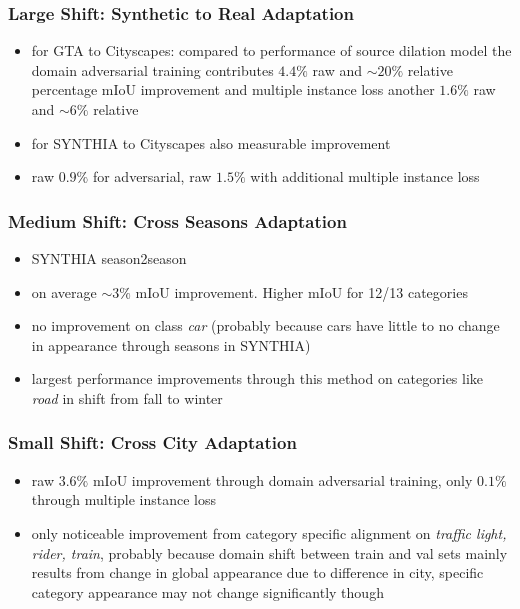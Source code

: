 
\subsubsection{Large Shift: Synthetic to Real Adaptation}
\begin{itemize}
	\item for GTA to Cityscapes: compared to performance of source dilation model the domain adversarial training contributes $4.4\%$ raw and $\sim 20\%$ relative percentage mIoU improvement and multiple instance loss another $1.6\%$ raw and $\sim 6 \%$ relative
	\item for SYNTHIA to Cityscapes also measurable improvement
	\item raw $0.9\%$ for adversarial, raw $1.5\%$ with additional multiple instance loss
\end{itemize}

\subsubsection{Medium Shift: Cross Seasons Adaptation}
\begin{itemize}
	\item SYNTHIA season2season
	\item on average $\sim 3 \%$ mIoU improvement. Higher mIoU for 12/13 categories
	\item no improvement on class \textit{car} (probably because cars have little to no change in appearance through seasons in SYNTHIA)
	\item largest performance improvements through this method on categories like \textit{road} in shift from fall to winter
\end{itemize}

\subsubsection{Small Shift: Cross City Adaptation}
\begin{itemize}
	\item raw $3.6\%$ mIoU improvement through domain adversarial training, only $0.1\%$ through multiple instance loss
	\item only noticeable improvement from category specific alignment on \textit{traffic light, rider, train}, probably because domain shift between train and val sets mainly results from change in global appearance due to difference in city, specific category appearance may not change significantly though
\end{itemize}

